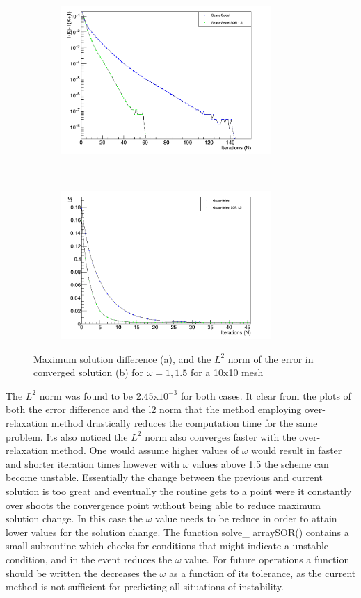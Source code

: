 \documentclass[paper=a4, fontsize=11pt, abstract=on]{scrartcl}
\numberwithin{equation}{section}		%
\numberwithin{figure}{section}			%
\numberwithin{table}{section}				%
\begin{document}
\begin{figure}[H]
        \centering
        \begin{subfigure}[h]{0.5\textwidth}
                \includegraphics[width = 8.0cm]{conv}
                \caption{}
				
        \end{subfigure}%
       ~~~~~
        \begin{subfigure}[h]{0.5\textwidth}
                \includegraphics[width = 8.0cm]{l2con}
                \caption{}
                
        \end{subfigure}
        \caption{Maximum solution difference (a), and the $L^2$ norm of the error in converged solution (b) for $\omega = 1, 1.5$ for a 10x10 mesh }
        \label{q34}
\end{figure}

The $L^2$ norm was found to be 2.45x$10^{-3}$ for both cases. It clear from the plots of both the error difference and the l2 norm that the method employing over-relaxation method drastically reduces the computation time for the same problem. Its also noticed the $L^2$ norm also converges faster with the over-relaxation method. One would assume higher values of $\omega$ would result in faster and shorter iteration times however with $\omega$ values above 1.5 the scheme can become unstable.  Essentially the change between the previous and current solution is too great and eventually the routine gets to a point were it constantly over shoots the convergence point without being able to reduce maximum solution change. In this case the $\omega$ value needs to be reduce in order to attain lower values for the solution change. The function solve\_ arraySOR() contains a small subroutine which checks for conditions that might indicate a unstable condition, and in the event reduces the $\omega$ value. For  future operations a function should be written the decreases the $\omega$ as a function of its tolerance, as the current method is not sufficient for predicting all situations of instability.
\end{document}
